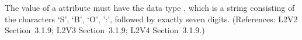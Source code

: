 The value of a  attribute must have the data type
, which is a string consisting of the characters `S', `B',
`O', ':', followed by exactly seven digits.  (References: L2V2 
Section~3.1.9; L2V3 Section~3.1.9; L2V4 Section~3.1.9.)
